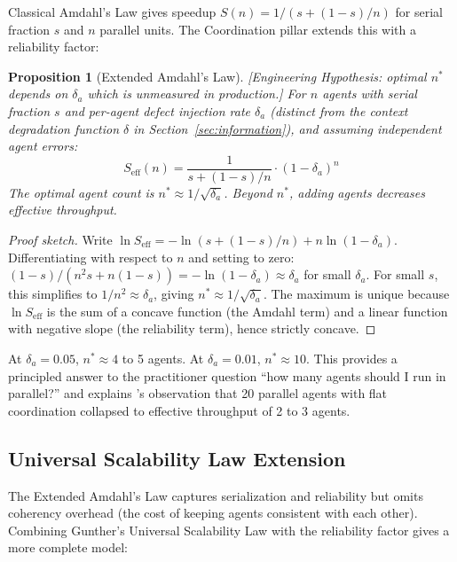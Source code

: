 \documentclass[11pt, a4paper, logo, copyright]{googledeepmind}
\newtheorem{proposition}{Proposition}[section]
\begin{document}
Classical Amdahl's Law gives speedup $S(n) = 1/(s + (1-s)/n)$ for serial fraction $s$ and $n$ parallel units. The Coordination pillar extends this with a reliability factor:

\begin{proposition}[Extended Amdahl's Law]
\emph{[Engineering Hypothesis: optimal $n^*$ depends on $\delta_a$ which is unmeasured in production.]}
\label{thm:extended-amdahl}
For $n$ agents with serial fraction $s$ and per-agent defect injection rate $\delta_a$ (distinct from the context degradation function $\delta$ in Section~\ref{sec:information}), and assuming independent agent errors:
\begin{equation}
    S_{\text{eff}}(n) = \frac{1}{s + (1-s)/n} \cdot (1-\delta_a)^n
\end{equation}
The optimal agent count is $n^* \approx 1/\sqrt{\delta_a}$. Beyond $n^*$, adding agents \emph{decreases} effective throughput.
\end{proposition}

\begin{proof}[Proof sketch]
Write $\ln S_{\mathrm{eff}} = -\ln(s + (1-s)/n) + n \ln(1-\delta_a)$.
Differentiating with respect to $n$ and setting to zero:
$(1-s)/(n^2 s + n(1-s)) = -\ln(1-\delta_a) \approx \delta_a$ for small $\delta_a$.
For small $s$, this simplifies to $1/n^2 \approx \delta_a$, giving $n^* \approx 1/\sqrt{\delta_a}$.
The maximum is unique because $\ln S_{\mathrm{eff}}$ is the sum of a concave function (the Amdahl term) and a linear function with negative slope (the reliability term), hence strictly concave.
\end{proof}

At $\delta_a = 0.05$, $n^* \approx 4$ to 5 agents. At $\delta_a = 0.01$, $n^* \approx 10$. This provides a principled answer to the practitioner question ``how many agents should I run in parallel?'' and explains \citeauthor{Cursor2026}'s observation that 20 parallel agents with flat coordination collapsed to effective throughput of 2 to 3 agents.

\subsection{Universal Scalability Law Extension}

The Extended Amdahl's Law captures serialization and reliability but omits coherency overhead (the cost of keeping agents consistent with each other). Combining Gunther's Universal Scalability Law \citep{gunther2008usl} with the reliability factor gives a more complete model:
\end{document}
